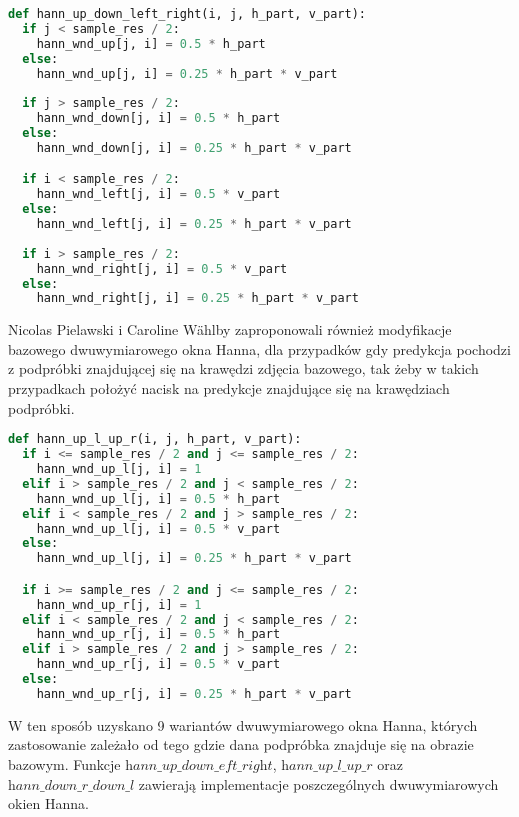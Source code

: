 \cell
\begin{lstlisting}[name=Rozdzial3.1, language=Python]
def hann_up_down_left_right(i, j, h_part, v_part):
  if j < sample_res / 2:
    hann_wnd_up[j, i] = 0.5 * h_part
  else:
    hann_wnd_up[j, i] = 0.25 * h_part * v_part
  
  if j > sample_res / 2:
    hann_wnd_down[j, i] = 0.5 * h_part
  else:
    hann_wnd_down[j, i] = 0.25 * h_part * v_part

  if i < sample_res / 2:
    hann_wnd_left[j, i] = 0.5 * v_part
  else:
    hann_wnd_left[j, i] = 0.25 * h_part * v_part
  
  if i > sample_res / 2:
    hann_wnd_right[j, i] = 0.5 * v_part
  else:
    hann_wnd_right[j, i] = 0.25 * h_part * v_part
\end{lstlisting}


\cell
Nicolas Pielawski i Caroline Wählby zaproponowali również modyfikacje bazowego dwuwymiarowego okna Hanna, dla przypadków gdy predykcja pochodzi z podpróbki znajdującej się na krawędzi zdjęcia bazowego, tak żeby w takich przypadkach położyć nacisk na predykcje znajdujące się na krawędziach podpróbki.

\cell
\begin{lstlisting}[name=Rozdzial3.1, language=Python]
def hann_up_l_up_r(i, j, h_part, v_part):
  if i <= sample_res / 2 and j <= sample_res / 2:
    hann_wnd_up_l[j, i] = 1
  elif i > sample_res / 2 and j < sample_res / 2:
    hann_wnd_up_l[j, i] = 0.5 * h_part
  elif i < sample_res / 2 and j > sample_res / 2:
    hann_wnd_up_l[j, i] = 0.5 * v_part
  else:
    hann_wnd_up_l[j, i] = 0.25 * h_part * v_part

  if i >= sample_res / 2 and j <= sample_res / 2:
    hann_wnd_up_r[j, i] = 1
  elif i < sample_res / 2 and j < sample_res / 2:
    hann_wnd_up_r[j, i] = 0.5 * h_part
  elif i > sample_res / 2 and j > sample_res / 2:
    hann_wnd_up_r[j, i] = 0.5 * v_part
  else:
    hann_wnd_up_r[j, i] = 0.25 * h_part * v_part
\end{lstlisting}


\cell
W ten sposób uzyskano 9 wariantów dwuwymiarowego okna Hanna, których zastosowanie zależało od tego gdzie dana podpróbka znajduje się na obrazie bazowym. Funkcje $\textit{hann$\_$up$\_$down$\_$eft$\_$right}$, $\textit{hann$\_$up$\_$l$\_$up$\_$r}$ oraz $\textit{hann$\_$down$\_$r$\_$down$\_$l}$ zawierają implementacje poszczególnych dwuwymiarowych okien Hanna.

